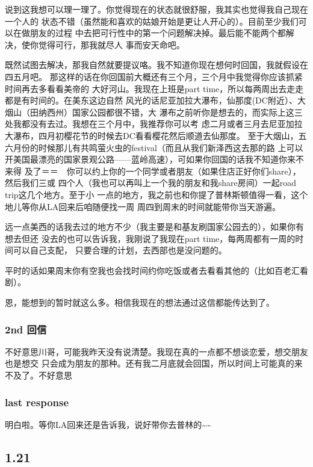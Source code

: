 \documentclass[11pt]{article}
\begin{document}
说到这我想可以理一理了。你觉得现在的状态就很舒服，我其实也觉得我自己现在一个人的
状态不错（虽然能和喜欢的姑娘开始是更让人开心的）。目前至少我们可以在做朋友的过程
中去把可行性中的第一个问题解决掉。最后能不能两个都解决，使你觉得可行，那我就尽人
事而安天命吧。

既然试图去解决，那我自然就要提议咯。我不知道你现在想何时回国，我就假设在四五月吧。
那这样的话在你回国前大概还有三个月，三个月中我觉得你应该抓紧时间再去多看看美帝的
大好河山。我现在上班是part time，所以每两周出去走走都是有时间的。在美东这边自然
风光的话尼亚加拉大瀑布，仙那度(DC附近）、大烟山（田纳西州）国家公园都很不错，大
瀑布之前听你是想去的，而实际上这三处我都没有去过。我想在三个月中，我推荐你可以考
虑二月或者三月去尼亚加拉大瀑布，四月初樱花节的时候去DC看看樱花然后顺道去仙那度。
至于大烟山，五六月份的时候那儿有共鸣萤火虫的festival（而且从我们新泽西这去那的路
上可以开美国最漂亮的国家景观公路——蓝岭高速），可如果你回国的话我不知道你来不来得
及了＝＝　你可以约上你的一个同学或者朋友（如果住店正好你们share），然后我们三或
四个人（我也可以再叫上一个我的朋友和我share房间）一起road trip这几个地方。至于小
一点的地方，我之前也和你提了普林斯顿值得一看，这个地儿等你从LA回来后咱随便找一周
周四到周末的时间就能带你当天游遍。

远一点美西的话我去过的地方不少（我主要是和基友刷国家公园去的），如果你有想去但还
没去的也可以告诉我，我刚说了我现在part time，每两周都有一周的时间可以自己支配，
只要合理的计划，去西部也是没问题的。

平时的话如果周末你有空我也会找时间约你吃饭或者去看看其他的（比如百老汇看剧）。

恩，能想到的暂时就这么多。相信我现在的想法通过这信都能传达到了。

\subsubsection*{2nd 回信}
\label{sec:orgheadline36}
不好意思川哥，可能我昨天没有说清楚。我现在真的一点都不想谈恋爱，想交朋友也是想交
只会成为朋友的那种。还有我二月底就会回国，所以时间上可能真的来不及了。不好意思

\subsubsection*{last response}
\label{sec:orgheadline37}
明白啦。等你LA回来还是告诉我，说好带你去普林的\textasciitilde{}\textasciitilde{}
\subsection*{1.21}
\label{sec:orgheadline47}
\end{document}
